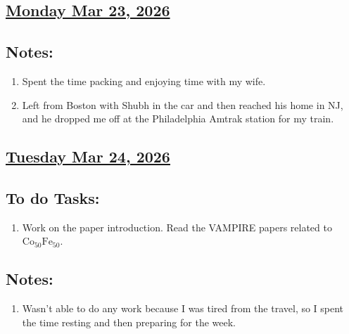 \subsection*{\underline{Monday Mar 23, 2026}}
\subsection*{Notes:}
\begin{enumerate}
    \item Spent the time packing and enjoying time with my wife.
    \item Left from Boston with Shubh in the car and then reached his home in NJ, and he dropped me off at the Philadelphia Amtrak station for my train.
\end{enumerate}
\subsection*{\underline{Tuesday Mar 24, 2026}}
\subsection*{To do Tasks:}
\begin{enumerate}
    \item Work on the paper introduction. Read the VAMPIRE papers related to $\mathrm{Co_{50}Fe_{50}}$. \xmark
\end{enumerate}
\subsection*{Notes:}
\begin{enumerate}
    \item Wasn't able to do any work because I was tired from the travel, so I spent the time resting and then preparing for the week.
\end{enumerate}
